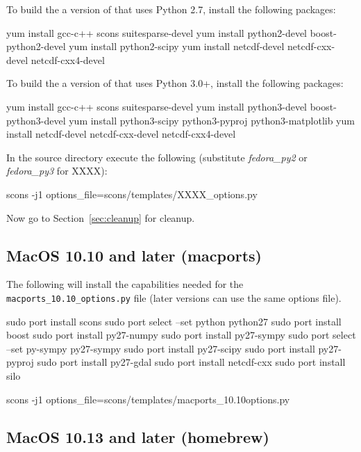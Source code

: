 \noindent To build the a version of \escript that uses Python 2.7, install the following packages:
\begin{shellCode}
yum install gcc-c++ scons suitesparse-devel
yum install python2-devel boost-python2-devel
yum install python2-scipy
yum install netcdf-devel netcdf-cxx-devel netcdf-cxx4-devel
\end{shellCode}

\noindent To build the a version of \escript that uses Python 3.0+, install the following packages:
\begin{shellCode}
yum install gcc-c++ scons suitesparse-devel
yum install python3-devel boost-python3-devel
yum install python3-scipy python3-pyproj python3-matplotlib
yum install netcdf-devel netcdf-cxx-devel netcdf-cxx4-devel
\end{shellCode}

\noindent In the source directory execute the following (substitute \textit{fedora_py2} or \textit{fedora_py3} for XXXX):
\begin{shellCode}
scons -j1 options_file=scons/templates/XXXX_options.py
\end{shellCode}

\noindent Now go to Section~\ref{sec:cleanup} for cleanup.

\subsection{MacOS 10.10 and later (macports)}\label{sec:macportsrc}

The following will install the capabilities needed for the \texttt{macports_10.10_options.py} file (later versions can use the same options file).

\begin{shellCode}
sudo port install scons
sudo port select --set python python27
sudo port install boost
sudo port install py27-numpy
sudo port install py27-sympy
sudo port select --set py-sympy py27-sympy
sudo port install py27-scipy
sudo port install py27-pyproj
sudo port install py27-gdal
sudo port install netcdf-cxx
sudo port install silo
\end{shellCode}

\begin{shellCode}
scons -j1 options_file=scons/templates/macports_10.10options.py
\end{shellCode}


\subsection{MacOS 10.13 and later (homebrew)}\label{sec:homebrewsrc}

